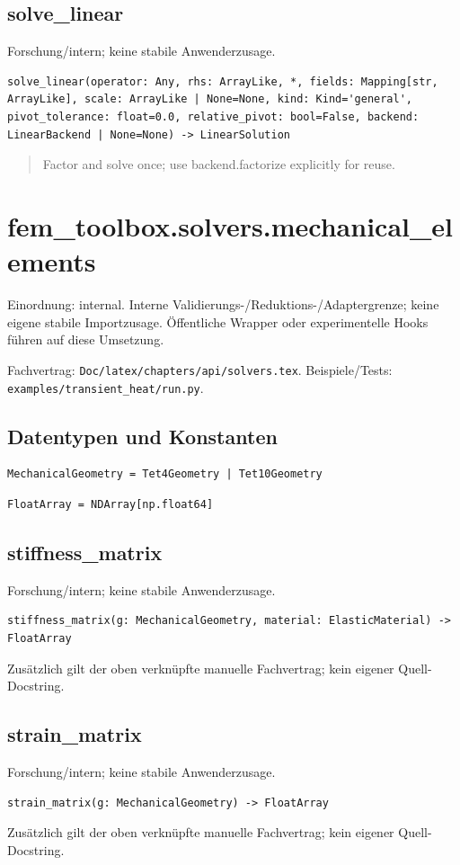 \subsection{solve\_linear}
Forschung/intern; keine stabile Anwenderzusage.
\begin{lstlisting}
solve_linear(operator: Any, rhs: ArrayLike, *, fields: Mapping[str, ArrayLike], scale: ArrayLike | None=None, kind: Kind='general', pivot_tolerance: float=0.0, relative_pivot: bool=False, backend: LinearBackend | None=None) -> LinearSolution
\end{lstlisting}
\begin{quote}
Factor and solve once; use backend.factorize explicitly for reuse.
\end{quote}
\section{fem\_toolbox.solvers.mechanical\_elements}
Einordnung: internal. Interne Validierungs-/Reduktions-/Adaptergrenze; keine eigene stabile Importzusage. Öffentliche Wrapper oder experimentelle Hooks führen auf diese Umsetzung.
\par Fachvertrag: \nolinkurl{Doc/latex/chapters/api/solvers.tex}. Beispiele/Tests:
\nolinkurl{examples/transient_heat/run.py}.
\subsection*{Datentypen und Konstanten}
\begin{lstlisting}
MechanicalGeometry = Tet4Geometry | Tet10Geometry
\end{lstlisting}
\begin{lstlisting}
FloatArray = NDArray[np.float64]
\end{lstlisting}
\subsection{stiffness\_matrix}
Forschung/intern; keine stabile Anwenderzusage.
\begin{lstlisting}
stiffness_matrix(g: MechanicalGeometry, material: ElasticMaterial) -> FloatArray
\end{lstlisting}
Zusätzlich gilt der oben verknüpfte manuelle Fachvertrag; kein eigener Quell-Docstring.
\subsection{strain\_matrix}
Forschung/intern; keine stabile Anwenderzusage.
\begin{lstlisting}
strain_matrix(g: MechanicalGeometry) -> FloatArray
\end{lstlisting}
Zusätzlich gilt der oben verknüpfte manuelle Fachvertrag; kein eigener Quell-Docstring.
